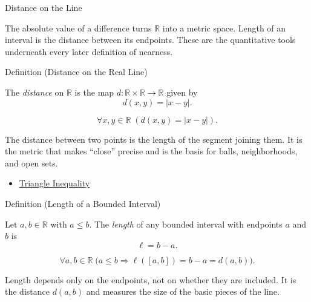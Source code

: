 \label{sec:order-distance-length}

\begin{topicbox}{Distance on the Line}
\begin{exposition}
The absolute value of a difference turns $\mathbb{R}$ into a metric space. Length of an interval is the distance between its endpoints. These are the quantitative tools underneath every later definition of nearness.
\end{exposition}
\end{topicbox}
\begin{definitionbox}{Definition (Distance on the Real Line)}
\begin{definition}
\label{def:distance-on-real-line}
The \emph{distance} on $\mathbb{R}$ is the map $d:\mathbb{R}\times\mathbb{R}\to\mathbb{R}$ given by
\[
d(x,y)=|x-y|.
\]
\end{definition}
\end{definitionbox}
\begin{remark*}
\[
\forall x,y\in\mathbb{R}\;(d(x,y)=|x-y|).
\]
\end{remark*}
\begin{remark*}[Interpretation]
The distance between two points is the length of the segment joining them. It is the metric that makes ``close'' precise and is the basis for balls, neighborhoods, and open sets.
\end{remark*}
\begin{dependencies}
\begin{itemize}
  \item \hyperref[thm:triangle-inequality]{Triangle Inequality}
\end{itemize}
\end{dependencies}
\begin{definitionbox}{Definition (Length of a Bounded Interval)}
\begin{definition}
\label{def:length-of-interval}
Let $a,b\in\mathbb{R}$ with $a\le b$. The \emph{length} of any bounded interval with endpoints $a$ and $b$ is
\[
\ell=b-a.
\]
\end{definition}
\end{definitionbox}
\begin{remark*}
\[
\forall a,b\in\mathbb{R}\;\bigl(a\le b \Longrightarrow \ell([a,b])=b-a=d(a,b)\bigr).
\]
\end{remark*}
\begin{remark*}[Interpretation]
Length depends only on the endpoints, not on whether they are included. It is the distance $d(a,b)$ and measures the size of the basic pieces of the line.
\end{remark*}
